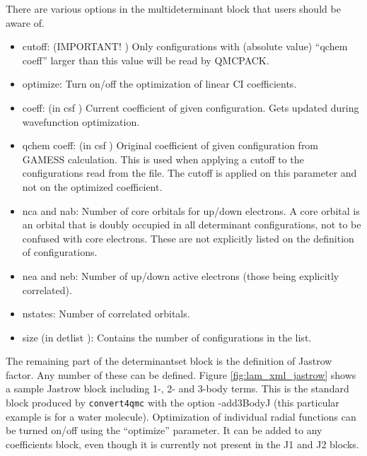 There are various options in the multideterminant block that users should be aware of.
\begin{itemize}
  \item{cutoff: (IMPORTANT! ) Only configurations with (absolute value) “qchem coeff”
larger than this value will be read by QMCPACK.}
  \item{optimize: Turn on/off the optimization of linear CI coefficients.}
  \item{coeff: (in csf ) Current coefficient of given configuration. Gets updated during 
wavefunction optimization.}
  \item{qchem coeff: (in csf ) Original coefficient of given configuration from GAMESS 
calculation. This is used when applying a cutoff to the configurations read from the file.
The cutoff is applied on this parameter and not on the optimized coefficient.}
  \item{nca and nab: Number of core orbitals for up/down electrons. A core orbital is an
orbital that is doubly occupied in all determinant configurations, not to be confused
with core electrons. These are not explicitly listed on the definition of configurations.}
  \item{nea and neb: Number of up/down active electrons (those being explicitly correlated).}
  \item{nstates: Number of correlated orbitals}.
  \item{size (in detlist ): Contains the number of configurations in the list.}
\end{itemize}
The remaining part of the determinantset block is the definition of Jastrow factor. Any
number of these can be defined. Figure \ref{fig:lam_xml_jastrow} shows a sample Jastrow 
block including 1-, 2- and 3-body terms. This is the standard block produced by 
\texttt{convert4qmc} with the option -add3BodyJ (this particular example is for a water molecule). 
Optimization of individual radial functions can be turned on/off using the “optimize” 
parameter. It can be added to any coefficients block, even though it is currently not 
present in the J1 and J2 blocks.

